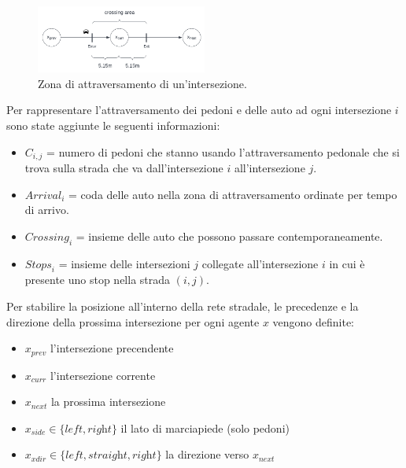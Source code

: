 \begin{figure}[ht]
    \centering
    \includegraphics[width=0.5\textwidth]{images/crossing_area}
    \caption{Zona di attraversamento di un'intersezione.}
    \label{fig:crossing-area}
\end{figure}

Per rappresentare l'attraversamento dei pedoni e delle auto ad ogni intersezione $i$ sono state aggiunte le seguenti informazioni:
\begin{itemize}
    \item $C_{i, j}$ = numero di pedoni che stanno usando l'attraversamento pedonale che si trova sulla strada che va dall'intersezione $i$ all'intersezione $j$.
    \item $\textit{Arrival}_i$ = coda delle auto nella zona di attraversamento ordinate per tempo di arrivo.
    \item $\textit{Crossing}_i$ = insieme delle auto che possono passare contemporaneamente.
    \item $\textit{Stops}_i$ = insieme delle intersezioni $j$ collegate all'intersezione $i$ in cui è presente uno stop nella strada $(i, j)$.
\end{itemize}


Per stabilire la posizione all'interno della rete stradale, le precedenze e la direzione della prossima intersezione per ogni agente $x$
vengono definite:
\begin{itemize}
    \item $x_{prev}$ l'intersezione precendente
    \item $x_{curr}$ l'intersezione corrente
    \item $x_{next}$ la prossima intersezione
    \item $x_{side} \in \{ \textit{left}, \textit{right} \}$  il lato di marciapiede (solo pedoni)
    \item $x_{xdir} \in \{\textit{left}, \textit{straight}, \textit{right}\}$ la direzione verso $x_{next}$
\end{itemize}

